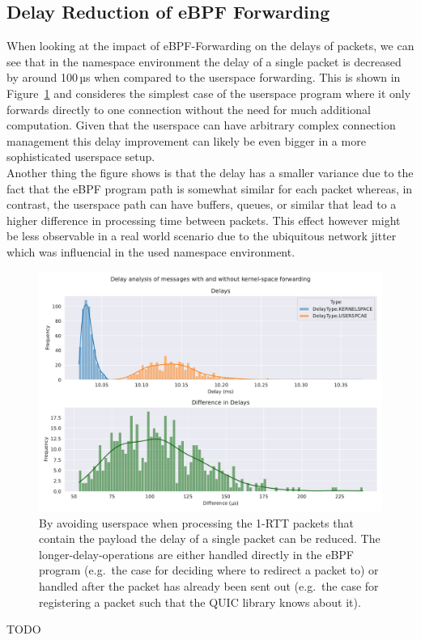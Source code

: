 \subsection{Delay Reduction of eBPF Forwarding}
When looking at the impact of eBPF-Forwarding on the delays of packets, we can see that
in the namespace environment the delay of a single packet is decreased by around 100\,µs
when compared to the userspace forwarding. This is shown in Figure~\ref{fig:delay-improvement} and 
consideres the simplest case of the userspace program where it only forwards directly to one connection
without the need for much additional computation. Given that the userspace can have arbitrary complex 
connection management this delay improvement can likely be even bigger in a more sophisticated userspace
setup.
\\
Another thing the figure shows is that the delay has a smaller variance due to the fact that the eBPF program
path is somewhat similar for each packet whereas, in contrast, the userspace path can have buffers, queues, 
or similar that lead to a higher difference in processing time between packets. 
This effect however might be less observable in a real world scenario due to the ubiquitous network jitter which 
was influencial in the used namespace environment.
\begin{figure}[htbp]
    \centering
    \includegraphics[width=\textwidth]{figures/04_testing_and_results/delays_small_packets_simple_userspace.pdf}
    \caption[Delay analysis of eBPF approach]{By avoiding userspace when processing the 1-RTT packets that contain the payload
    the delay of a single packet can be reduced. The longer-delay-operations are either handled
    directly in the eBPF program (e.g.~the case for deciding where to redirect a packet to) or 
    handled after the packet has already been sent out (e.g.~the case for registering a packet 
    such that the QUIC library knows about it).}\label{fig:delay-improvement}
\end{figure}
TODO


